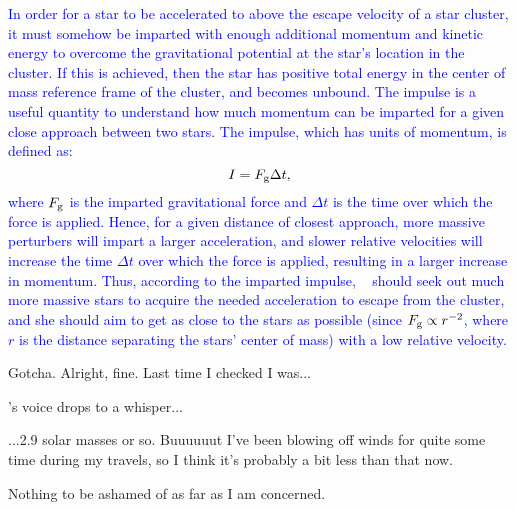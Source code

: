 \documentclass[main.tex]{subfiles}
\begin{document}
\begin{tcolorbox}[sharp corners, colback=blue!30, colframe=blue!80!blue, title=Impulse]
\par \textcolor{blue} {In order for a star to be accelerated to above the escape velocity of a star cluster, it must somehow be imparted with enough additional momentum and kinetic energy to overcome the gravitational potential at the star's location in the cluster.  If this is achieved, then the star has positive total energy in the center of mass reference frame of the cluster, and becomes unbound.  The impulse is a useful quantity to understand how much momentum can be imparted for a given close approach between two stars.  The impulse, which has units of momentum, is defined as:
\begin{equation}
I = F_{\rm g}{\Delta}t,
\end{equation}
where $F_{\rm g}$ is the imparted gravitational force and $\Delta{t}$ is the time over which the force is applied.  Hence, for a given distance of closest approach, more massive perturbers will impart a larger acceleration, and slower relative velocities will increase the time $\Delta{t}$ over which the force is applied, resulting in a larger increase in momentum.  Thus, according to the imparted impulse, \rmsterope~ should seek out much more massive stars to acquire the needed acceleration to escape from the cluster, and she should aim to get as close to the stars as possible (since $F_{\rm g} \propto r^{-2}$, where $r$ is the distance separating the stars' center of mass) with a low relative velocity.
} 
\end{tcolorbox} 

\par \Sterope Gotcha.  Alright, fine.  Last time I checked I was...

\par \nar \rmsterope's voice drops to a whisper...

\par \Sterope ...2.9 solar masses or so.  Buuuuuut I've been blowing off winds for quite some time during my travels, so I think it's probably a bit less than that now.  

\begin{tcolorbox}[sharp corners, colback=blue!30, colframe=blue!80!blue, title=Stellar Winds]
\par \textcolor{blue} {
} 
\end{tcolorbox} 

\par \Enrico Nothing to be ashamed of as far as I am concerned.
\end{document}
